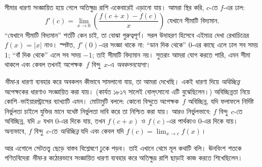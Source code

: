 \documentclass[../../../include/open-logic-section]{subfiles}
\begin{document}
সীমার ধারণা সংজ্ঞায়িত হয়ে
গেলে অতিক্ষুদ্র রাশি একেবারেই
এড়ানো যায়। আমরা স্থির
করি, $c$-তে $f$-এর ঢাল:
\[
	{f}'(c) = \lim_{x \rightarrow 0}\left(\frac{f(c +x) - f(c)}{x}\right) \text{ যেখানে সীমাটি বিদ্যমান}.
\]
“যেখানে সীমাটি বিদ্যমান”
শর্তটি কেন চাই, তা বোঝা
গুরুত্বপূর্ণ। সরল উদাহরণ
হিসেবে এইমাত্র দেখা রেখাচিত্রের
$f(x) = |x|$ নাও।
স্পষ্টত, $f'(0)$-এর
সংজ্ঞা থাকে না: “ডান
দিক থেকে” $0$-এর
কাছে এলে ঢাল সব
সময় $1$; “বাঁ দিক
থেকে” এলে সব সময়
$-1$; তাই সীমাটি
বিদ্যমান নয়। সুতরাং
আমরা যোগ করতে পারি,
এমন সীমা থাকলে এবং
কেবল তখনই অপেক্ষক~$f$
বিন্দু~$x$-এ
\emph{অবকলনযোগ্য}।

\emph{সীমা}-র ধারণা
ব্যবহার করে অবকলন
কীভাবে সামলানো যায়,
তা আমরা দেখেছি।
একই ধারণা দিয়ে
\emph{অবিচ্ছিন্ন}
অপেক্ষকের ধারণাও
সংজ্ঞায়িত করা যায়।
(কার্যত ১৮১৭ সালেই
বোল্‌ৎসানো এটি
বুঝেছিলেন।)
অবিচ্ছিন্নতা নিয়ে
কোশি--ভাইয়ারস্ট্রাসের
ব্যাখ্যাটি এমন। মোটামুটি
বললে: কোনো বিন্দুতে
অপেক্ষক~$f$ অবিচ্ছিন্ন,
যদি ফলাফলে নির্দিষ্ট
নির্ভুলতা চাইলে
যুক্তির মানে যথেষ্ট
নির্ভুলতা দাবি করে
তা নিশ্চিত করা যায়।
আরও নির্ভুলভাবে:
$f$ বিন্দু~$c$-তে
অবিচ্ছিন্ন, যদি $x$
যখন $0$-এর দিকে
যায়, তখন
$f(c + x)$ ও
$f(c)$-এর পার্থক্যও
$0$-এর দিকে যায়।
অন্যভাবে, $f$ বিন্দু~$c$-তে
\emph{অবিচ্ছিন্ন}
যদি এবং কেবল যদি
$f(c) = \lim_{x \rightarrow c} f(x)$।

আর এগোলে সেটতত্ত্ব
ছেড়ে বাস্তব বিশ্লেষণে
ঢুকে পড়ব। তাই
এখানে থেমে মূল
কথাটি বলি।
ঊনবিংশ শতকে
গণিতবিদেরা
\emph{সীমা}-র
কঠোরভাবে সংজ্ঞায়িত
ধারণা ব্যবহার করে
অতিক্ষুদ্র রাশি
ছাড়াই কাজ করতে
শিখেছিলেন।
\end{document}
